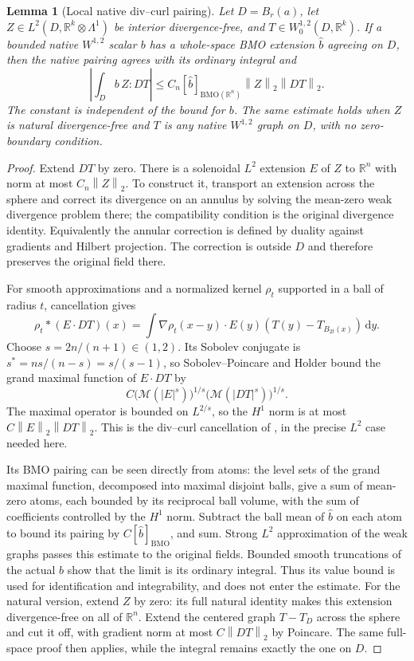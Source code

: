 \documentclass[reqno,11pt]{amsart}
\numberwithin{equation}{section}
\newtheorem{lemma}[theorem]{Lemma}
\theoremstyle{definition}
\theoremstyle{remark}
\newcommand{\R}{\mathbb R}
\newcommand{\dd}{\,\mathrm d}
\newcommand{\BMO}{\mathrm{BMO}}
\newcommand{\norm}[1]{\left\lVert#1\right\rVert}
\begin{document}
\begin{lemma}[Local native div--curl pairing]\label{lem:divcurl}
Let $D=B_r(a)$, let $Z\in L^2(D,\R^k\otimes\Lambda^1)$ be
interior divergence-free, and $T\in W^{1,2}_0(D,\R^k)$.
If a bounded native $W^{1,2}$ scalar $b$ has a whole-space BMO extension
$\widehat b$ agreeing on $D$, then the native pairing agrees with its
ordinary integral and
\begin{equation}\label{eq:clms}
 \left|\int_D b\,Z:DT\right|
 \leq C_n[\widehat b]_{\BMO(\R^n)}\norm Z_2\norm{DT}_2.
\end{equation}
The constant is independent of the bound for $b$.
The same estimate holds when $Z$ is natural divergence-free and $T$
is any native $W^{1,2}$ graph on $D$, with no zero-boundary condition.
\end{lemma}
\begin{proof}
Extend $DT$ by zero. There is a solenoidal $L^2$ extension $E$ of $Z$
to $\R^n$ with norm at most $C_n\norm Z_2$. To construct it,
transport an extension across the sphere and correct its divergence on
an annulus by solving the mean-zero weak divergence problem there;
the compatibility condition is the original divergence identity.
Equivalently the annular correction is defined by duality against
gradients and Hilbert projection. The correction is outside $D$ and
therefore preserves the original field there.

For smooth approximations and a normalized kernel $\rho_t$ supported
in a ball of radius $t$, cancellation gives
\[
 \rho_t*(E\cdot DT)(x)
 =\int \nabla\rho_t(x-y)\cdot E(y)
                    (T(y)-T_{B_{2t}(x)})\dd y.
\]
Choose $s=2n/(n+1)\in(1,2)$. Its Sobolev conjugate is
$s^*=ns/(n-s)=s/(s-1)$, so Sobolev--Poincare and Holder bound the grand
maximal function of $E\cdot DT$ by
\[
 C\bigl(\mathcal M(|E|^s)\bigr)^{1/s}
   \bigl(\mathcal M(|DT|^s)\bigr)^{1/s}.
\]
The maximal operator is bounded on $L^{2/s}$, so the $H^1$ norm is at
most $C\norm E_2\norm{DT}_2$. This is the div--curl cancellation of
\cite{CLMS}, in the precise $L^2$ case needed here.

Its BMO pairing can be seen directly from atoms: the level sets of
the grand maximal function, decomposed into maximal disjoint balls,
give a sum of mean-zero atoms, each bounded by its reciprocal ball
volume, with the sum of coefficients controlled by the $H^1$ norm.
Subtract the ball mean of $\widehat b$ on each atom to bound its pairing
by $C[\widehat b]_{\BMO}$, and sum. Strong $L^2$ approximation of
the weak graphs passes this estimate to the original fields. Bounded
smooth truncations of the actual $b$ show that the limit is its ordinary
integral. Thus its value bound is used for identification and
integrability, and does not enter the estimate.
For the natural version, extend $Z$ by zero: its full natural identity
makes this extension divergence-free on all of $\R^n$. Extend the
centered graph $T-T_D$ across the sphere and cut it off, with gradient
norm at most $C\norm{DT}_2$ by Poincare. The same full-space proof
then applies, while the integral remains exactly the one on $D$.
\end{proof}
\end{document}
